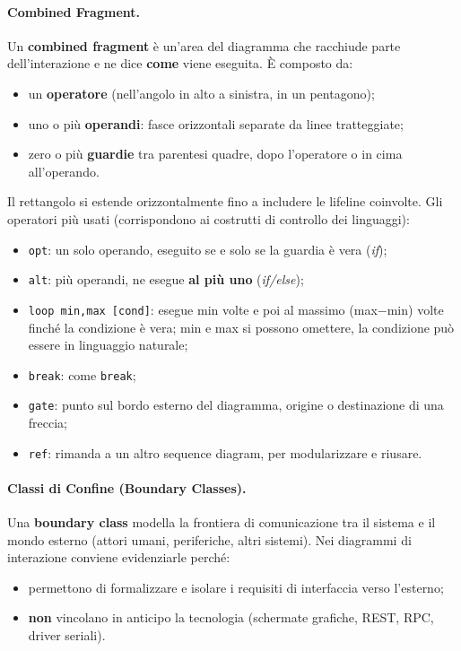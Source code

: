 \documentclass[12pt]{extarticle}
\begin{document}
\paragraph{Combined Fragment.}
Un \textbf{combined fragment} è un'area del diagramma che racchiude parte dell'interazione e ne dice \textbf{come} viene eseguita. È composto da:
\begin{itemize}
    \item un \textbf{operatore} (nell'angolo in alto a sinistra, in un pentagono);
    \item uno o più \textbf{operandi}: fasce orizzontali separate da linee tratteggiate;
    \item zero o più \textbf{guardie} tra parentesi quadre, dopo l'operatore o in cima all'operando.
\end{itemize}
Il rettangolo si estende orizzontalmente fino a includere le lifeline coinvolte. Gli operatori più usati (corrispondono ai costrutti di controllo dei linguaggi):
\begin{itemize}
    \item \texttt{opt}: un solo operando, eseguito se e solo se la guardia è vera (\textit{if});
    \item \texttt{alt}: più operandi, ne esegue \textbf{al più uno} (\textit{if/else});
    \item \texttt{loop min,max [cond]}: esegue min volte e poi al massimo (max$-$min) volte finché la condizione è vera; min e max si possono omettere, la condizione può essere in linguaggio naturale;
    \item \texttt{break}: come \texttt{break};
    \item \texttt{gate}: punto sul bordo esterno del diagramma, origine o destinazione di una freccia;
    \item \texttt{ref}: rimanda a un altro sequence diagram, per modularizzare e riusare.
\end{itemize}

\paragraph{Classi di Confine (Boundary Classes).}
Una \textbf{boundary class} modella la frontiera di comunicazione tra il sistema e il mondo esterno (attori umani, periferiche, altri sistemi). Nei diagrammi di interazione conviene evidenziarle perché:
\begin{itemize}
    \item permettono di formalizzare e isolare i requisiti di interfaccia verso l'esterno;
    \item \textbf{non} vincolano in anticipo la tecnologia (schermate grafiche, REST, RPC, driver seriali).
\end{itemize}
\end{document}
